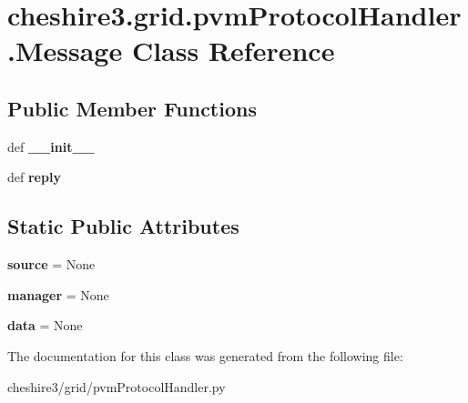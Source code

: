 \hypertarget{classcheshire3_1_1grid_1_1pvm_protocol_handler_1_1_message}{\section{cheshire3.\-grid.\-pvm\-Protocol\-Handler.\-Message Class Reference}
\label{classcheshire3_1_1grid_1_1pvm_protocol_handler_1_1_message}
}
\subsection*{Public Member Functions}
\begin{DoxyCompactItemize}
\item 
\hypertarget{classcheshire3_1_1grid_1_1pvm_protocol_handler_1_1_message_a92a29d12fb26e6fd2d8de9c88b9d776f}{def {\bfseries \-\_\-\-\_\-init\-\_\-\-\_\-}}\label{classcheshire3_1_1grid_1_1pvm_protocol_handler_1_1_message_a92a29d12fb26e6fd2d8de9c88b9d776f}

\item 
\hypertarget{classcheshire3_1_1grid_1_1pvm_protocol_handler_1_1_message_a1fc9164390c82f316e0903e565c4b8bc}{def {\bfseries reply}}\label{classcheshire3_1_1grid_1_1pvm_protocol_handler_1_1_message_a1fc9164390c82f316e0903e565c4b8bc}

\end{DoxyCompactItemize}
\subsection*{Static Public Attributes}
\begin{DoxyCompactItemize}
\item 
\hypertarget{classcheshire3_1_1grid_1_1pvm_protocol_handler_1_1_message_aa4ed8f076d05b1f5d5138759a569b5c7}{{\bfseries source} = None}\label{classcheshire3_1_1grid_1_1pvm_protocol_handler_1_1_message_aa4ed8f076d05b1f5d5138759a569b5c7}

\item 
\hypertarget{classcheshire3_1_1grid_1_1pvm_protocol_handler_1_1_message_a53c44598b2bf04d00b2e195e7a52f1bf}{{\bfseries manager} = None}\label{classcheshire3_1_1grid_1_1pvm_protocol_handler_1_1_message_a53c44598b2bf04d00b2e195e7a52f1bf}

\item 
\hypertarget{classcheshire3_1_1grid_1_1pvm_protocol_handler_1_1_message_abf4bfbbe086c6ffc0fe9cc1aabb593e1}{{\bfseries data} = None}\label{classcheshire3_1_1grid_1_1pvm_protocol_handler_1_1_message_abf4bfbbe086c6ffc0fe9cc1aabb593e1}

\end{DoxyCompactItemize}


The documentation for this class was generated from the following file\-:\begin{DoxyCompactItemize}
\item 
cheshire3/grid/pvm\-Protocol\-Handler.\-py\end{DoxyCompactItemize}

